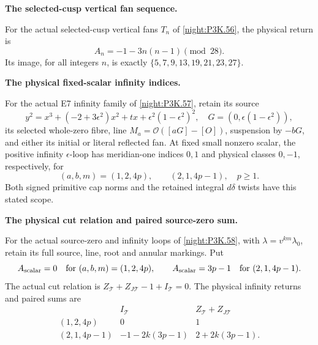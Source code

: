 \begin{proposition}\hypertarget{tag-01UO}{}\label{iv:correction:P3K.56}

\textbf{The selected-cusp vertical fan sequence.}\par
For the actual selected-cusp vertical fans
\(T_n\) of \cref{night:P3K.56}, the physical return is
\[
 A_n=-1-3n(n-1)\pmod{28}.
\]
Its image, for all integers \(n\), is exactly
\(\{5,7,9,13,19,21,23,27\}\).
\end{proposition}

\begin{proposition}\hypertarget{tag-01UP}{}\label{iv:correction:P3K.57}

\textbf{The physical fixed-scalar infinity indices.}\par
For the actual E7 infinity family of
\cref{night:P3K.57}, retain its source
\[
 y^2=x^3+(-2+3\epsilon^2)x^2+tx+
 \epsilon^2(1-\epsilon^2)^2,
 \quad G=(0,\epsilon(1-\epsilon^2)),
\]
its selected whole-zero fibre, line
\(M_a=\mathcal O([aG]-[O])\), suspension by \(-bG\),
and either its initial or literal reflected fan.
At fixed small nonzero scalar, the positive infinity
\(\epsilon\)-loop has meridian-one indices \(0,1\)
and physical classes \(0,-1\), respectively, for
\[
 (a,b,m)=(1,2,4p),\qquad(2,1,4p-1),\quad p\ge1.
\]
Both signed primitive cap norms and the retained integral
\(d\delta\) twists have this stated scope.
\end{proposition}

\begin{proposition}\hypertarget{tag-01UQ}{}\label{iv:correction:P3K.58}

\textbf{The physical cut relation and paired source-zero sum.}\par
For the actual source-zero and infinity loops
of \cref{night:P3K.58}, with
\(\lambda=v^{km}\lambda_0\), retain its full source,
line, root and annular markings. Put
\[
 A_{\rm scalar}=0\quad\text{for }(a,b,m)=(1,2,4p),
 \qquad A_{\rm scalar}=3p-1\quad\text{for }(2,1,4p-1).
\]
The actual cut relation is
\(Z_{\mathcal T}+Z_{J\mathcal T}-1+I_{\mathcal T}=0\).
The physical infinity returns and paired sums are
\[
 \begin{array}{c|cc}
 &I_{\mathcal T}&Z_{\mathcal T}+Z_{J\mathcal T}\\\hline
 (1,2,4p)&0&1\\
 (2,1,4p-1)&-1-2k(3p-1)&2+2k(3p-1).
 \end{array}
\]
\end{proposition}

